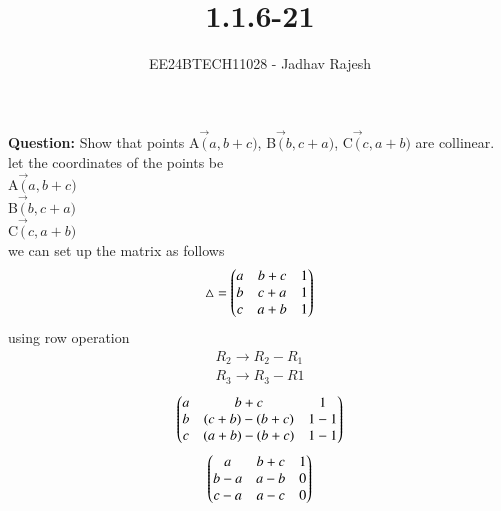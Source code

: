 \documentclass[journal]{IEEEtran}
\begin{document}

\vspace{3cm}
\title{1.1.6-21}
\author{EE24BTECH11028 - Jadhav Rajesh}
{\let\newpage\relax\maketitle}

\renewcommand{\thefigure}{\theenumi}
\renewcommand{\thetable}{\theenumi}
\setlength{\intextsep}{10pt} %


\renewcommand{\thetable}{\theenumi}
 \textbf{Question:} Show that points A$\vec(a,b+c)$, B$\vec(b,c+a)$, C$\vec(c,a+b)$ are collinear.\\
 \solution let the coordinates of the points be \\
              A$\vec(a,b+c)$\\
              B$\vec(b,c+a)$\\
              C$\vec(c,a+b)$\\
        we can set up the matrix as follows\\
    \begin{align}
          \triangle = \begin{pmatrix}
                              a & b+c & 1\\
                              b & c+a & 1\\
                              c & a+b & 1\end{pmatrix}
    \end{align} 
    using row operation\\
    \begin{align}
                   R_{2}\rightarrow{R_{2}-R_{1}}\\
                   R_{3}\rightarrow{R_{3}-R{1}}
    \end{align}
    \begin{align}
                  \begin{pmatrix}
                         a & b+c & 1\\
                         b & \mathbf(c+b)-\mathbf(b+c) & 1-1\\
                         c & \mathbf(a+b)-\mathbf(b+c) & 1-1\end{pmatrix}
    \end{align}
    \begin{align}
                    \begin{pmatrix}
                            a & b+c & 1\\
                            b-a & a-b & 0\\
                            c-a & a-c & 0\end{pmatrix}
    \end{align}
\end{document}
